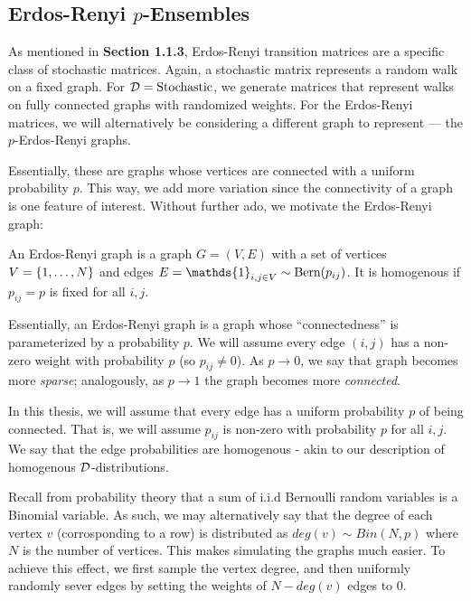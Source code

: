 
\subsection{Erdos-Renyi $p$-Ensembles}

As mentioned in \textbf{Section 1.1.3}, Erdos-Renyi transition matrices are a specific class of stochastic matrices.
Again, a stochastic matrix represents a random walk on a fixed graph. For $\D = \text{Stochastic}$, we generate matrices that represent walks on fully connected graphs with randomized weights.
For the Erdos-Renyi matrices, we will alternatively be considering a different graph to represent --- the $p$-Erdos-Renyi graphs.

Essentially, these are graphs whose vertices are connected with a uniform probability $p$.
This way, we add more variation since the connectivity of a graph is one feature of interest.
Without further ado, we motivate the Erdos-Renyi graph:

\begin{definition}
An Erdos-Renyi graph is a graph $G = (V,E)$ with a set of vertices $V = \{\oneto[N]\}$ and edges $E = \mathds{1}_{i,j \in V} \sim \Bern(p_{ij})$. It is homogenous if $p_{ij} = p$ is fixed for all $i, j$.
\end{definition}

Essentially, an Erdos-Renyi graph is a graph whose ``connectedness'' is parameterized by a probability $p$.
We will assume every edge $(i,j)$ has a non-zero weight with probability $p$ (so $p_{ij} \neq 0$).
As $p \to 0$, we say that graph becomes more \textit{sparse}; analogously, as $p \to 1$ the graph becomes more \textit{connected}.

\begin{remark}[Homogeneity]
In this thesis, we will assume that every edge has a uniform probability $p$ of being connected.
That is, we will assume $p_{ij}$ is non-zero with probability $p$ for all $i,j$.
We say that the edge probabilities are homogenous - akin to our description of homogenous $\D$-distributions.
\end{remark}

Recall from probability theory that a sum of i.i.d Bernoulli random variables is a Binomial variable.
As such, we may alternatively say that the degree of each vertex $v$ (corrosponding to a row) is distributed as $deg(v) \sim Bin(N,p)$ where $N$ is the number of vertices.
This makes simulating the graphs much easier. To achieve this effect, we first sample the vertex degree, and then uniformly randomly sever edges by setting the weights of $N - deg(v)$ edges to $0$. \newline

